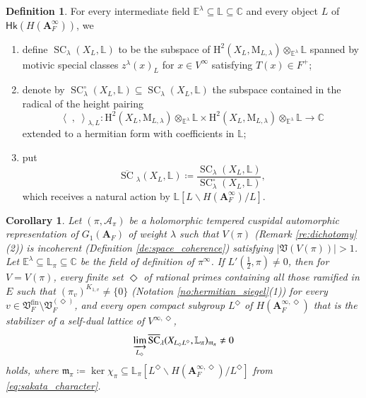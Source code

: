 \documentclass[12pt]{amsart}
\numberwithin{equation}{section}
\theoremstyle{plain}
\newtheorem{corollary}[proposition]{Corollary}
\theoremstyle{definition}
\newtheorem{definition}[proposition]{Definition}
\theoremstyle{remark}
\renewcommand{\b}[1]{\mathbf{#1}}
\renewcommand{\c}[1]{\mathcal{#1}}
\renewcommand{\d}[1]{\mathbb{#1}}
\newcommand{\f}[1]{\mathfrak{#1}}
\renewcommand{\r}[1]{\mathrm{#1}}
\renewcommand{\sf}[1]{\mathsf{#1}}
\renewcommand{\(}{\left(}
\renewcommand{\)}{\right)}
\newcommand{\ol}[1]{\overline{#1}{}}
\newcommand{\bA}{\b A}
\newcommand{\cA}{\c A}
\newcommand{\dC}{\d C}
\newcommand{\dE}{\d E}
\newcommand{\dL}{\d L}
\newcommand{\fV}{\f V}
\newcommand{\fm}{\f m}
\newcommand{\rH}{\r H}
\newcommand{\rM}{\r M}
\newcommand{\llangle}{\left\langle}
\newcommand{\rrangle}{\right\rangle}
\newcommand{\fin}{\r{fin}}
\newcommand{\Hk}{\sf{Hk}}
\DeclareMathOperator{\Ker}{ker}
\DeclareMathOperator{\SC}{SC}
\begin{document}
\begin{definition}\label{de:special_numerical}
For every intermediate field $\dE^\lambda\subseteq\dL\subseteq\dC$ and every object $L$ of $\Hk(H(\bA_F^\infty))$, we
\begin{enumerate}
  \item define $\SC_\lambda(X_L,\dL)$ to be the subspace of $\rH^2(X_L,\rM_{L,\lambda})\otimes_{\dE^\lambda}\dL$ spanned by motivic special classes $z^\lambda(x)_L$ for $x\in V^\infty$ satisfying $T(x)\in F^+$;

  \item denote by $\SC_\lambda^\circ(X_L,\dL)\subseteq\SC_\lambda(X_L,\dL)$ the subspace contained in the radical of the height pairing
      \[
      \llangle\;,\;\rrangle_{\lambda,L}\colon
      \rH^2(X_L,\rM_{L,\lambda})\otimes_{\dE^\lambda}\dL\times\rH^2(X_L,\rM_{L,\lambda})\otimes_{\dE^\lambda}\dL\to\dC
      \]
      extended to a hermitian form with coefficients in $\dL$;

  \item put
      \[
      \ol\SC_\lambda(X_L,\dL)\coloneqq\frac{\SC_\lambda(X_L,\dL)}{\SC_\lambda^\circ(X_L,\dL)},
      \]
      which receives a natural action by $\dL[L\backslash H(\bA_F^\infty)/L]$.
\end{enumerate}
\end{definition}


\begin{corollary}\label{co:derivative}
Let $(\pi,\cA_\pi)$ be a holomorphic tempered cuspidal automorphic representation of $G_1(\bA_F)$ of weight $\lambda$ such that $V(\pi)$ (Remark \ref{re:dichotomy}(2)) is incoherent (Definition \ref{de:space_coherence}) satisfying $|\fV(V(\pi))|>1$. Let $\dE^\lambda\subseteq\dL_\pi\subseteq\dC$ be the field of definition of $\pi^\infty$. If $L'(\tfrac{1}{2},\pi)\neq 0$, then for $V=V(\pi)$, every finite set $\Diamond$ of rational primes containing all those ramified in $E$ such that $(\pi_v)^{K_{1,v}}\neq\{0\}$ (Notation \ref{no:hermitian_siegel}(1)) for every $v\in\fV_F^\fin\setminus\fV_F^{(\Diamond)}$, and every open compact subgroup $L^\Diamond$ of $H(\bA^{\infty,\Diamond}_F)$ that is the stabilizer of a self-dual lattice of $V^{\infty,\Diamond}$,
\[
\varinjlim_{L_\Diamond}\ol\SC_\lambda(X_{L_\Diamond L^\Diamond},\dL_{\pi})_{\fm_\pi}\neq 0
\]
holds, where $\fm_\pi\coloneqq\Ker\chi_\pi\subseteq\dL_\pi[L^\Diamond\backslash H(\bA_F^{\infty,\Diamond})/L^\Diamond]$ from \eqref{eq:sakata_character}.
\end{corollary}
\end{document}
